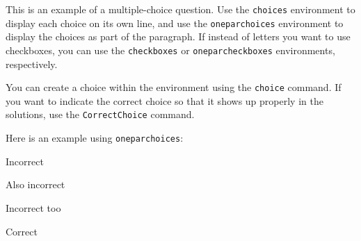 
This is an example of a multiple-choice question. Use the \texttt{choices}
environment to display each choice on its own line, and use the
\texttt{oneparchoices} environment to display the choices as part of the
paragraph. If instead of letters you want to use checkboxes, you can use the
\texttt{checkboxes} or \texttt{oneparcheckboxes} environments, respectively.

You can create a choice within the environment using the \texttt{choice}
command. If you want to indicate the correct choice so that it shows up properly
in the solutions, use the \texttt{CorrectChoice} command.

Here is an example using \texttt{oneparchoices}:

\begin{oneparchoices}

  \choice Incorrect

  \choice Also incorrect

  \choice Incorrect too

  \CorrectChoice Correct

\end{oneparchoices}

